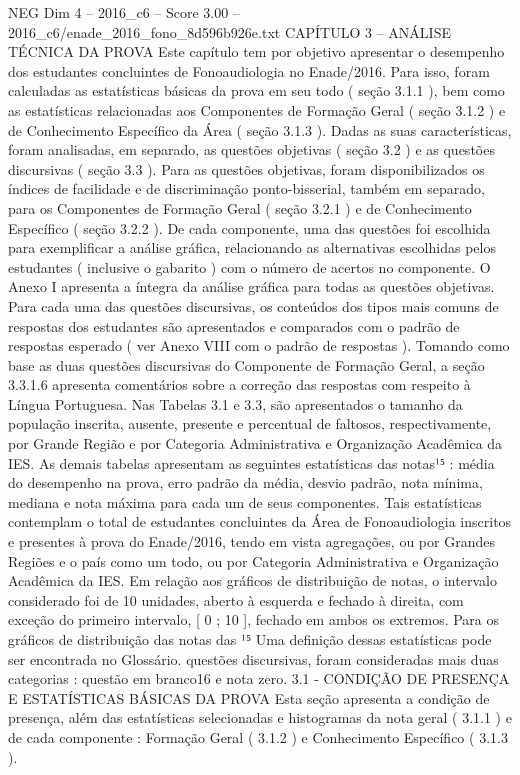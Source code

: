 \begin{textsample}{NEG Dim 4 – 2016\_c6 – Score 3.00 – 2016\_c6/enade\_2016\_fono\_8d596b926e.txt}  \label{ex:f4_neg_307}
CAPÍTULO 3 – ANÁLISE TÉCNICA DA PROVA Este capítulo tem por objetivo apresentar o desempenho dos estudantes concluintes de Fonoaudiologia no Enade/2016.
Para isso, foram calculadas as estatísticas básicas da prova em seu todo ( seção 3.1.1 ), bem como as estatísticas relacionadas aos Componentes de Formação Geral ( seção 3.1.2 ) e de Conhecimento Específico da Área ( seção 3.1.3 ).
Dadas as suas características, foram analisadas, em separado, as questões objetivas ( seção 3.2 ) e as questões discursivas ( seção 3.3 ).
Para as questões objetivas, foram disponibilizados os índices de facilidade e de discriminação ponto-bisserial, também em separado, para os Componentes de Formação Geral ( seção 3.2.1 ) e de Conhecimento Específico ( seção 3.2.2 ).
De cada componente, uma das questões foi escolhida para exemplificar a análise gráfica, relacionando as alternativas escolhidas pelos estudantes ( inclusive o gabarito ) com o número de acertos no componente.
O Anexo I apresenta a íntegra da análise gráfica para todas as questões objetivas.
Para cada uma das questões discursivas, os conteúdos dos tipos mais comuns de respostas dos estudantes são apresentados e comparados com o padrão de respostas esperado ( ver Anexo VIII com o padrão de respostas ).
Tomando como base as duas questões discursivas do Componente de Formação Geral, a seção 3.3.1.6 apresenta comentários sobre a correção das respostas com respeito à Língua Portuguesa.
Nas Tabelas 3.1 e 3.3, são apresentados o tamanho da população inscrita, ausente, presente e percentual de faltosos, respectivamente, por Grande Região e por Categoria Administrativa e Organização Acadêmica da IES.
As demais tabelas apresentam as seguintes estatísticas das notas¹⁵ : média do desempenho na prova, erro padrão da média, desvio padrão, nota mínima, mediana e nota máxima para cada um de seus componentes.
Tais estatísticas contemplam o total de estudantes concluintes da Área de Fonoaudiologia inscritos e presentes à prova do Enade/2016, tendo em vista agregações, ou por Grandes Regiões e o país como um todo, ou por Categoria Administrativa e Organização Acadêmica da IES.
Em relação aos gráficos de distribuição de notas, o intervalo considerado foi de 10 unidades, aberto à esquerda e fechado à direita, com exceção do primeiro intervalo, [ 0 ; 10 ], fechado em ambos os extremos.
Para os gráficos de distribuição das notas das ¹⁵ Uma definição dessas estatísticas pode ser encontrada no Glossário. questões discursivas, foram consideradas mais duas categorias : questão em branco16 e nota zero. 3.1 - CONDIÇÃO DE PRESENÇA E ESTATÍSTICAS BÁSICAS DA PROVA Esta seção apresenta a condição de presença, além das estatísticas selecionadas e histogramas da nota geral ( 3.1.1 ) e de cada componente : Formação Geral ( 3.1.2 ) e Conhecimento Específico ( 3.1.3 ).

\end{textsample}
